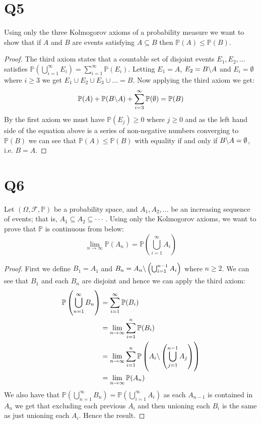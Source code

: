 \documentclass{article}
\begin{document}
\section*{Q5}
Using only the three Kolmogorov axioms of a probability measure we want to show that if $A$ and $B$ are events satisfying $A\subseteq B$ then $\mathbb{P}(A)\leq\mathbb{P}(B)$.
\begin{proof}
The third axiom states that a countable set of disjoint events $E_1,E_2,...$ satisfies $\mathbb{P}\left(\bigcup_{i=1}^{\infty}E_i\right)=\sum_{i=1}^{\infty}\mathbb{P}(E_i)$. Letting $E_1=A$, $E_2=B\symbol{92}A$ and $E_i=\emptyset$ where $i\geq3$ we get $E_1\cup E_2\cup E_3\cup ...=B$. Now applying the third axiom we get:
$$\mathbb{P}(A)+\mathbb{P}(B\symbol{92}A)+\sum_{i=3}^{\infty}\mathbb{P}(\emptyset)=\mathbb{P}(B)$$
By the first axiom we must have $\mathbb{P}(E_j)\geq0$ where $j\geq0$ and as the left hand side of the equation above is a series of non-negative numbers converging to $\mathbb{P}(B)$ we can see that $\mathbb{P}(A)\leq\mathbb{P}(B)$ with equality if and only if $B\symbol{92}A=\emptyset$, i.e. $B=A$.
\end{proof}
\section*{Q6}
Let $(\Omega, \mathcal{F}, \mathbb{P})$ be a probability space, and $A_1, A_2, ...$ be an increasing sequence of events; that is, $A_1\subseteq A_2\subseteq···$ . Using only the Kolmogorov axioms, we want to prove that $\mathbb{P}$
is continuous from below:
$$\lim_{n\rightarrow\infty}\mathbb{P}(A_n)=\mathbb{P}\left(\bigcup_{i=1}^{\infty}A_i\right)$$
\begin{proof}
First we define $B_1=A_1$ and $B_n=A_n\symbol{92}\left(\bigcup_{i=1}^{n-1}A_i\right)$ where $n\geq2$. We can see that $B_1$ and each $B_n$ are disjoint and hence we can apply the third axiom:
\begin{align*}
\mathbb{P}\left(\bigcup_{n=1}^\infty B_n\right)&=\sum_{i=1}^{\infty}\mathbb{P}(B_i)\\
&=\lim_{n\rightarrow\infty}\sum_{i=1}^{n}\mathbb{P}(B_i)\\
&=\lim_{n\rightarrow\infty}\sum_{i=1}^{n}\mathbb{P}\left(A_i\symbol{92}\left(\bigcup_{j=1}^{n-1}A_j\right)\right)\\
&=\lim_{n\rightarrow\infty}\mathbb{P}(A_n)\\
\end{align*}
We also have that $\mathbb{P}\left(\bigcup_{n=1}^\infty B_n\right)=\mathbb{P}\left(\bigcup_{i=1}^{\infty}A_i\right)$ as each $A_{n-1}$ is contained in $A_{n}$ we get that excluding each previous $A_i$ and then unioning each $B_i$ is the same as just unioning each $A_i$. Hence the result. 
\end{proof}
\end{document}
